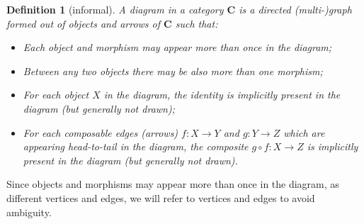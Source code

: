 \documentclass[12pt,oneside]{scrbook}
\numberwithin{equation}{section}
\theoremstyle{plain}
\newtheorem{deph}[thm]{Definition}
\theoremstyle{definition}
\newcommand{\cat}[1]{{\mathbf{#1}}} %
\DeclareMathOperator{\1}{\mathbbm{1}}
\DeclareMathOperator{\2}{\mathbbm{2}}
\begin{document}
\begin{deph}[informal]
 A \emph{diagram} in a category $\cat{C}$ is a directed (multi-)graph formed out of objects and arrows of $\cat{C}$ such that:
 \begin{itemize}
  \item Each object and morphism may appear more than once in the diagram;
  \item Between any two objects there may be also more than one morphism;
  \item For each object $X$ in the diagram, the identity is implicitly present in the diagram (but generally not drawn);
  \item For each composable edges (arrows) $f:X\to Y$ and $g:Y\to Z$ which are appearing head-to-tail in the diagram, the composite $g\circ f:X\to Z$ is implicitly present in the diagram (but generally not drawn).
 \end{itemize}
\end{deph}

Since objects and morphisms may appear more than once in the diagram, as different vertices and edges, we will refer to vertices and edges to avoid ambiguity. 
\end{document}

